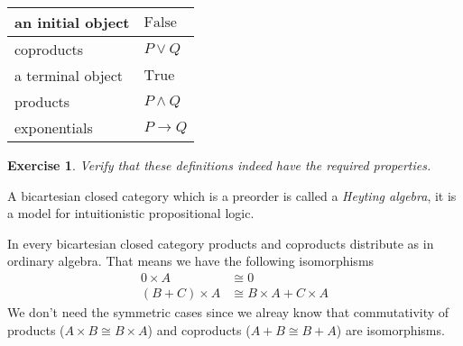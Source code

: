 \documentclass{article}
\newcommand{\True}{\mathrm{True}}
\newcommand{\False}{\mathrm{False}}
\newcommand{\cat}[1]{\underline{\mathbf{#1}}}
\newtheorem{exercise}{Exercise}
\begin{document}
\begin{tabular}{|l|l|}
\hline
an initial object & $\False$ \\\hline
coproducts & $P \vee Q$ \\ \hline
a terminal object & $\True$ \\\hline
products & $P \wedge Q$ \\\hline
exponentials & $P \to Q$\\\hline
\end{tabular}

\begin{exercise}
Verify that these definitions indeed have the required properties.
\end{exercise}
A bicartesian closed category which is a preorder is called a \emph{Heyting algebra}, it is a model for intuitionistic propositional logic.


In every bicartesian closed category products and coproducts distribute as in ordinary algebra. That means we have the following isomorphisms
\begin{align*}
  0 \times A & \cong 0 \\
  (B + C)\times A & \cong B\times A + C \times A
\end{align*}
We don't need the symmetric cases since we alreay know that commutativity of products ($A \times B \cong B \times A$) and coproducts ($A + B \cong B + A$) are isomorphisms.
\end{document}
